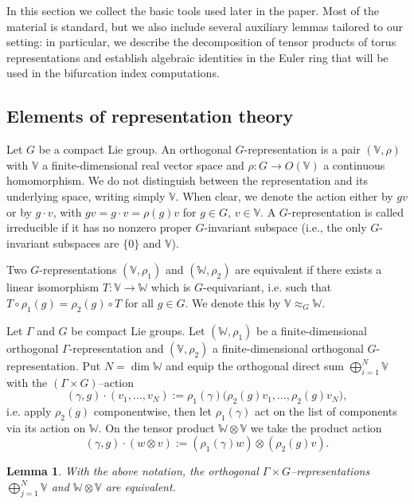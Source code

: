 \documentclass[reqno,twoside,12pt]{amsart}
\newtheorem{Lemma}[Remark]{Lemma}
\newcommand{\bV}{\mathbb{V}}
\newcommand{\bW}{\mathbb{W}}
\numberwithin{equation}{section} \errorcontextlines=0
\begin{document}
In this section we collect the basic tools used later in the paper. Most of the material is standard, but we also include several auxiliary lemmas tailored to our setting: in particular, we describe the decomposition of tensor products of torus representations and establish algebraic identities in the Euler ring that will be used in the bifurcation index computations.


\subsection{Elements of representation theory}\label{reptor}

Let $G$ be a compact Lie group. An orthogonal $G$-representation is a pair $(\bV,\rho)$ with $\bV$ a finite-dimensional real vector space and $\rho\colon G\to O(\bV)$ a continuous homomorphism. We do not distinguish between the representation and its underlying space, writing simply $\bV$. When clear, we denote the action either by $gv$ or by $g\cdot v$, with $gv=g\cdot v=\rho(g)v$ for $g\in G$, $v\in\bV$. A $G$-representation is called irreducible if it has no nonzero proper $G$-invariant subspace (i.e., the only $G$-invariant subspaces are $\{0\}$ and $\bV$).

Two $G$-representations $(\bV,\rho_1)$ and $(\bW,\rho_2)$ are equivalent if there exists a linear isomorphism $T:\bV\to\bW$ which is $G$-equivariant, i.e. such that
$T\circ\rho_1(g)=\rho_2(g)\circ T$ for all $g\in G$.
We denote this by $\bV\approx_G\bW$.

Let $\Gamma$ and $G$ be compact Lie groups. Let $(\bW,\rho_1)$ be a finite-dimensional orthogonal $\Gamma$-representation and $(\bV,\rho_2)$ a finite-dimensional orthogonal $G$-representation.
 Put $N=\dim\bW$ and equip the orthogonal direct sum $\bigoplus_{i=1}^{N}\bV$ with the $(\Gamma\times G)$–action
\[
(\gamma,g)\cdot(v_{1},\dots,v_{N})
:=\rho_{1}(\gamma)\bigl(\rho_{2}(g)v_{1},\dots,\rho_{2}(g)v_{N}\bigr),
\]
i.e. apply $\rho_2(g)$ componentwise, then let
$\rho_1(\gamma)$ act on the list of components via its action on $\bW$.
On the tensor product $\bW\otimes\bV$ we take the product action
\[
(\gamma,g)\cdot(w\otimes v):=(\rho_{1}(\gamma)w)\otimes(\rho_{2}(g)v).
\]


\begin{Lemma}\label{lem:external-tensor}
With the above notation, the orthogonal $\Gamma\times G$–representations $\bigoplus_{j=1}^{N}\bV$ and $\bW\otimes\bV$ are equivalent.
\end{Lemma}
\end{document}
